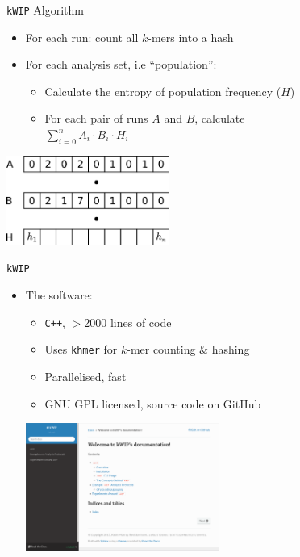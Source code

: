 \documentclass[t]{beamer}
\begin{document}
\begin{frame}{\texttt{kWIP} Algorithm}
  \begin{itemize}
    \item For each run: count all $k$-mers into a hash
    \pause
    \item For each analysis set, i.e ``population'':
      \begin{itemize}
        \item Calculate the entropy of population frequency ($H$)
        \item For each pair of runs $A$ and $B$, calculate \\
          $\sum\limits^{n}_{i=0} A_i \cdot B_i \cdot H_i$
      \end{itemize}
  \end{itemize}
  \begin{center}
    \includegraphics[width=0.4\textwidth]{img/hash-wip.png}
  \end{center}
\end{frame}


\begin{frame}{\texttt{kWIP}}
  \begin{itemize}
    \item The software:
      \begin{itemize}
        \item \texttt{C++}, $>$2000 lines of code
        \item Uses \texttt{khmer} for $k$-mer counting \& hashing
        \item Parallelised, fast
        \item GNU GPL licensed, source code on GitHub
      \end{itemize}
      \begin{center}
        \includegraphics[width=0.5\textwidth]{img/kwip-doc-screenshot.png}
      \end{center}
  \end{itemize}
\end{frame}
\end{document}
